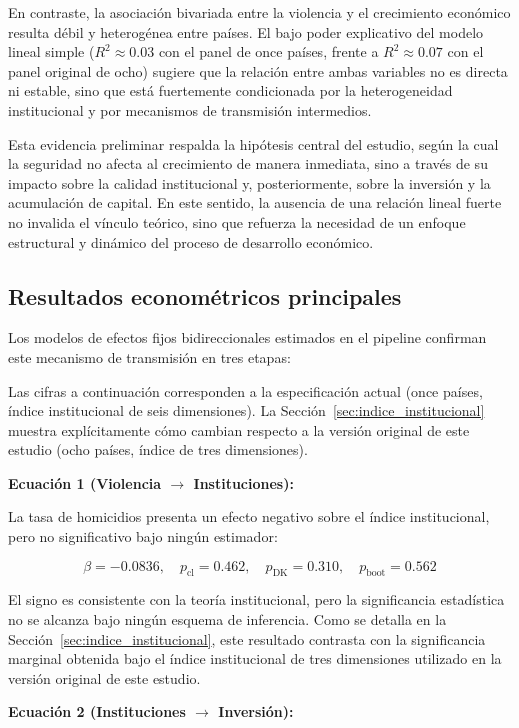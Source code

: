 \documentclass[11pt,a4paper]{article}
\begin{document}
En contraste, la asociación bivariada entre la violencia y el crecimiento económico resulta débil y heterogénea entre países. El bajo poder explicativo del modelo lineal simple ($R^2 \approx 0.03$ con el panel de once países, frente a $R^2 \approx 0.07$ con el panel original de ocho) sugiere que la relación entre ambas variables no es directa ni estable, sino que está fuertemente condicionada por la heterogeneidad institucional y por mecanismos de transmisión intermedios.

Esta evidencia preliminar respalda la hipótesis central del estudio, según la cual la seguridad no afecta al crecimiento de manera inmediata, sino a través de su impacto sobre la calidad institucional y, posteriormente, sobre la inversión y la acumulación de capital. En este sentido, la ausencia de una relación lineal fuerte no invalida el vínculo teórico, sino que refuerza la necesidad de un enfoque estructural y dinámico del proceso de desarrollo económico.

\subsection{Resultados econométricos principales}

Los modelos de efectos fijos bidireccionales estimados en el pipeline confirman este mecanismo de transmisión en tres etapas:

Las cifras a continuación corresponden a la especificación actual (once países, índice institucional de seis dimensiones). La Sección~\ref{sec:indice_institucional} muestra explícitamente cómo cambian respecto a la versión original de este estudio (ocho países, índice de tres dimensiones).

\textbf{Ecuación 1 (Violencia $\rightarrow$ Instituciones):}

La tasa de homicidios presenta un efecto negativo sobre el índice institucional, pero no significativo bajo ningún estimador:

\[
\beta = -0.0836, \quad p_{\text{cl}} = 0.462, \quad p_{\text{DK}} = 0.310, \quad p_{\text{boot}} = 0.562
\]

El signo es consistente con la teoría institucional, pero la significancia estadística no se alcanza bajo ningún esquema de inferencia. Como se detalla en la Sección~\ref{sec:indice_institucional}, este resultado contrasta con la significancia marginal obtenida bajo el índice institucional de tres dimensiones utilizado en la versión original de este estudio.

\textbf{Ecuación 2 (Instituciones $\rightarrow$ Inversión):}
\end{document}

